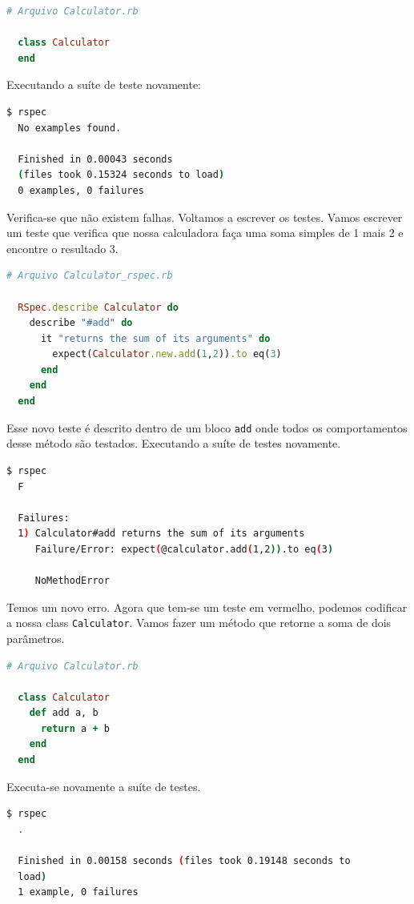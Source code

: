 \documentclass[12pt]{article}
\newcommand{\code}[1]{\texttt{#1}}
\begin{document}
  \begin{lstlisting}[language=Ruby]
  # Arquivo Calculator.rb

  class Calculator
  end
  \end{lstlisting}

  Executando a suíte de teste novamente:

  \begin{lstlisting}[language=bash]
  $ rspec
  No examples found.

  Finished in 0.00043 seconds 
  (files took 0.15324 seconds to load)
  0 examples, 0 failures
  \end{lstlisting}

  Verifica-se que não existem falhas. Voltamos a escrever os testes. Vamos 
  escrever um teste que verifica que nossa calculadora faça uma soma simples de 
  1 mais 2 e encontre o resultado 3.

  \begin{lstlisting}[language=Ruby]
  # Arquivo Calculator_rspec.rb

  RSpec.describe Calculator do
    describe "#add" do
      it "returns the sum of its arguments" do
        expect(Calculator.new.add(1,2)).to eq(3)
      end
    end
  end
  \end{lstlisting}

  Esse novo teste é descrito dentro de um bloco \code{add} onde todos os 
  comportamentos desse método são testados. Executando a suíte de testes
  novamente.

  \begin{lstlisting}[language=bash]
  $ rspec
  F

  Failures:
  1) Calculator#add returns the sum of its arguments 
     Failure/Error: expect(@calculator.add(1,2)).to eq(3)
     
     NoMethodError
  \end{lstlisting}
  
  Temos um novo erro. Agora que tem-se um teste em vermelho, podemos codificar a
  nossa class \code{Calculator}. Vamos fazer um método que retorne a soma de
  dois parâmetros.

  \begin{lstlisting}[language=Ruby]
  # Arquivo Calculator.rb

  class Calculator
    def add a, b
      return a + b
    end
  end
  \end{lstlisting}

  Executa-se novamente a suíte de testes.

  \begin{lstlisting}[language=bash]
  $ rspec
  .

  Finished in 0.00158 seconds (files took 0.19148 seconds to 
  load)
  1 example, 0 failures
  \end{lstlisting}
\end{document}
